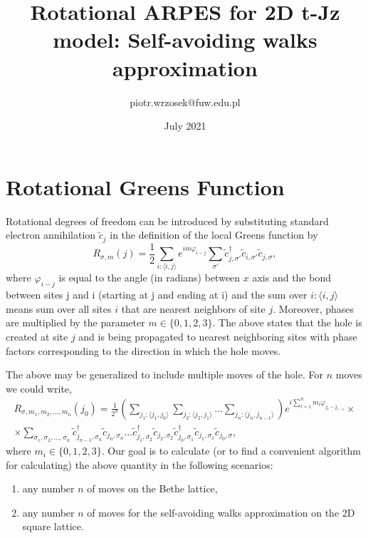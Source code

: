 \documentclass{article}
\title{Rotational ARPES for 2D t-Jz model: Self-avoiding walks approximation}
\author{piotr.wrzosek@fuw.edu.pl}
\date{July 2021}
\begin{document}
\maketitle

\section{Rotational Greens Function}
Rotational degrees of freedom can be introduced by substituting standard electron annihilation $\tilde{c}_j$ in the definition of the local Greens function by
\begin{equation}
    R_{\sigma, m}(j) = \frac{1}{2}\sum_{i:\langle i,j \rangle} e^{i m \varphi_{i-j}} \sum_{\sigma'} \tilde{c}_{j,\sigma'}^{\dag} \tilde{c}_{i,\sigma'} \tilde{c}_{j,\sigma},
\end{equation}
where $\varphi_{i-j}$ is equal to the angle (in radians) between $x$ axis and the bond between sites j and i (starting at j and ending at i) and the sum over $i:\langle i,j \rangle$ means sum over all sites $i$ that are nearest neighbors of site $j$. Moreover, phases are multiplied by the parameter $m \in \{0,1,2,3\}$.
The above states that the hole is created at site $j$ and is being propagated to nearest neighboring sites with phase factors corresponding to the direction in which the hole moves.

The above may be generalized to include multiple moves of the hole. For $n$ moves we could write,
\begin{equation}
\begin{split}
    R_{\sigma, m_1, m_2, ..., m_n}(j_0) = \frac{1}{2^n}\left(
    \sum_{j_1:\langle j_1,j_0 \rangle} 
    \sum_{j_2:\langle j_2,j_1 \rangle} 
    \hdots
    \sum_{j_n:\langle j_n,j_{n-1} \rangle}
        \right)
    e^{i \sum_{l = 1}^n m_l \varphi_{j_l-j_{l-1}}} 
    \times \\ \times 
    \sum_{\sigma_1, \sigma_2, ..., \sigma_n}
    \tilde{c}_{j_{n-1},\sigma_n}^{\dag} \tilde{c}_{j_n,\sigma_n}
    \hdots
    \tilde{c}_{j_1,\sigma_2}^{\dag} \tilde{c}_{j_2,\sigma_2}
    \tilde{c}_{j_0,\sigma_1}^{\dag} \tilde{c}_{j_1,\sigma_1} \tilde{c}_{j_0,\sigma},
\end{split}
\end{equation}
where $m_i \in \{0,1,2,3\}$.
Our goal is to calculate (or to find a convenient algorithm for calculating) the above quantity in the following scenarios:
\begin{enumerate}
    \item any number $n$ of moves on the Bethe lattice,
    \item any number $n$ of moves for the self-avoiding walks approximation on the 2D square lattice.
\end{enumerate}
\end{document}
